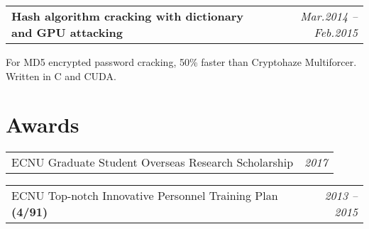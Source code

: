 \documentclass[a4paper,10pt]{article}
\newenvironment{packed_itemize}{
\begin{list}{\labelitemi}{\leftmargin=2em}
\setlength{\itemsep}{0pt}
\setlength{\parskip}{0pt}
\setlength{\parsep}{0pt}
\setlength{\headsep}{0pt}
\setlength{\topskip}{0pt}
\setlength{\topmargin}{0pt}
\setlength{\topsep}{0pt}
\setlength{\partopsep}{0pt}
}{\end{list}}
\begin{document}
\begin{tabular}{p{15cm}r}
\textbf{Hash algorithm cracking with dictionary and GPU attacking} & \emph{Mar.2014 – Feb.2015} \\
\end{tabular}

\begin{packed_itemize}
\item For MD5 encrypted password cracking, 50\% faster than Cryptohaze Multiforcer. Written in C and CUDA.
\end{packed_itemize}



\vspace{-0.2cm}
\section{Awards}

\vspace{-0.3cm}


\begin{packed_itemize}
\item
\begin{tabular}{p{16.5cm}r}
ECNU Graduate Student Overseas Research Scholarship & \emph{2017}
\end{tabular}
\item
\begin{tabular}{p{15.5cm}r}
ECNU Top-notch Innovative Personnel Training Plan \textbf{(4/91)} & \emph{2013 – 2015}
\end{tabular}
\end{packed_itemize}
\end{document}
